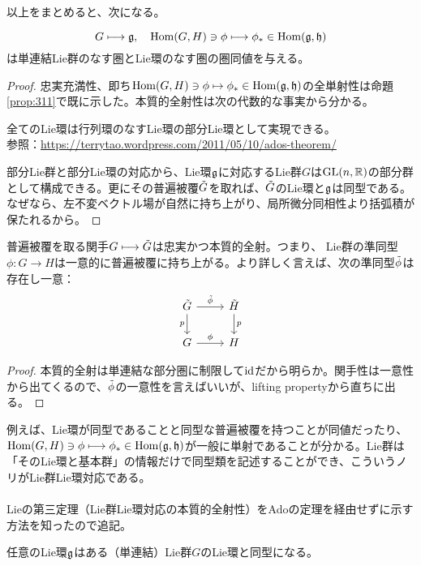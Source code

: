 以上をまとめると、次になる。
\begin{thm}[単連結Lie群とLie環の対応]
    \[G\longmapsto\g,\ \ \ \hom(G,H)\ni\phi\longmapsto\phi_*\in\hom(\g,\h)\]
    は単連結Lie群のなす圏とLie環のなす圏の圏同値を与える。
\end{thm}
\begin{proof}
    忠実充満性、即ち$\mathrm{Hom}(G,H)\ni\phi\mapsto\phi_*\in\mathrm{Hom}(\mathfrak{g},\mathfrak{h})$の全単射性は命題\ref{prop:311}で既に示した。本質的全射性は次の代数的な事実から分かる。
    \begin{fact}[Adoの定理]
        全てのLie環は行列環のなすLie環の部分Lie環として実現できる。\\
        参照：\url{https://terrytao.wordpress.com/2011/05/10/ados-theorem/}
    \end{fact}
    部分Lie群と部分Lie環の対応から、Lie環$\mathfrak{g}$に対応するLie群$G$は$\mathrm{GL}(n,\mathbb{R})$の部分群として構成できる。更にその普遍被覆$\Tilde{G}$を取れば、$\Tilde{G}$のLie環と$\mathfrak{g}$は同型である。なぜなら、左不変ベクトル場が自然に持ち上がり、局所微分同相性より括弧積が保たれるから。
\end{proof}
\begin{prop}
    普遍被覆を取る関手$G\longmapsto\Tilde{G}$は忠実かつ本質的全射。つまり、
    Lie群の準同型$\phi:G\to H$は一意的に普遍被覆に持ち上がる。より詳しく言えば、次の準同型$\Tilde{\phi}$は存在し一意：
    \[\begin{tikzcd}
        \Tilde{G}\arrow[r,"\Tilde{\phi}"]\arrow[d,"p"'] &\Tilde{H}\arrow[d,"p"]\\
        G\arrow[r,"\phi"] & H
    \end{tikzcd}\]
\end{prop}
\begin{proof}
    本質的全射は単連結な部分圏に制限して$\mathrm{id}$だから明らか。関手性は一意性から出てくるので、$\Tilde{\phi}$の一意性を言えばいいが、lifting propertyから直ちに出る。
\end{proof}
例えば、Lie環が同型であることと同型な普遍被覆を持つことが同値だったり、$\mathrm{Hom}(G,H)\ni\phi\longmapsto\phi_*\in\mathrm{Hom}(\mathfrak{g},\mathfrak{h})$が一般に単射であることが分かる。Lie群は「そのLie環と基本群」の情報だけで同型類を記述することができ、こういうノリがLie群Lie環対応である。\\
\ \\
Lieの第三定理（Lie群Lie環対応の本質的全射性）をAdoの定理を経由せずに示す方法を知ったので追記。
\begin{thm}[Lieの第三定理]
    任意のLie環$\mathfrak{g}$はある（単連結）Lie群$G$のLie環と同型になる。
\end{thm}
